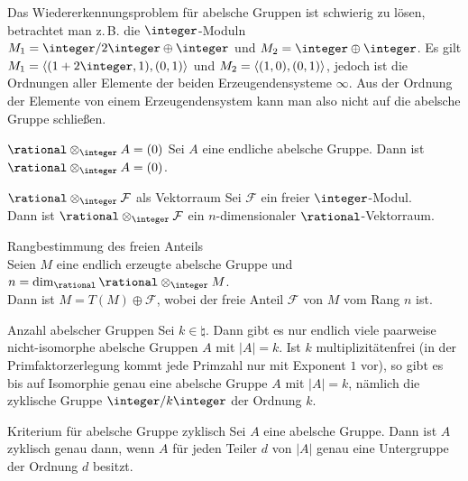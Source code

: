 \begin{Bem}
    Das Wiedererkennungsproblem für abelsche Gruppen ist schwierig zu lösen,
    betrachtet man z.\,B. die $\integer$-Moduln
    $M_1 = \integer/2\integer \oplus \integer$ und
    $M_2 = \integer \oplus \integer$.
    Es gilt $M_1 = \aufspann{(1 + 2\integer, 1), (0, 1)}$ und
    $M_2 = \langle (1, 0), (0, 1) \rangle$, jedoch ist die Ordnungen aller
    Elemente der beiden Erzeugendensysteme $\infty$.
    Aus der Ordnung der Elemente von einem Erzeugendensystem kann man also
    nicht auf die abelsche Gruppe schließen.
\end{Bem}

\begin{Satz}{$\rational \otimes_\integer A = (0)$}
    Sei $A$ eine endliche abelsche Gruppe.
    Dann ist $\rational \otimes_\integer A = (0)$.
\end{Satz}

\begin{Satz}{$\rational \otimes_\integer \mathcal{F}$ als Vektorraum}
    Sei $\mathcal{F}$ ein freier $\integer$-Modul. \\
    Dann ist $\rational \otimes_\integer \mathcal{F}$ ein $n$-dimensionaler
    $\rational$-Vektorraum.
\end{Satz}

\begin{Satz}{Rangbestimmung des freien Anteils} \\
    Seien $M$ eine endlich erzeugte abelsche Gruppe und
    $n = \dim_\rational \rational \otimes_\integer M$. \\
    Dann ist $M = T(M) \oplus \mathcal{F}$, wobei der freie Anteil
    $\mathcal{F}$ von $M$ vom Rang $n$ ist.
\end{Satz}

\begin{Satz}{Anzahl abelscher Gruppen}
    Sei $k \in \natural$.
    Dann gibt es nur endlich viele paarweise nicht-isomorphe
    abelsche Gruppen $A$ mit $|A| = k$.
    Ist $k$ multiplizitätenfrei (in der Primfaktorzerlegung kommt jede
    Primzahl nur mit Exponent $1$ vor), so gibt es bis auf
    Isomorphie genau eine abelsche Gruppe $A$ mit $|A| = k$, nämlich die
    zyklische Gruppe $\integer/k\integer$ der Ordnung $k$.
\end{Satz}

\begin{Satz}{Kriterium für abelsche Gruppe zyklisch}
    Sei $A$ eine abelsche Gruppe.
    Dann ist $A$ zyklisch genau dann, wenn $A$ für jeden Teiler $d$ von $|A|$
    genau eine Untergruppe der Ordnung $d$ besitzt.
\end{Satz}

